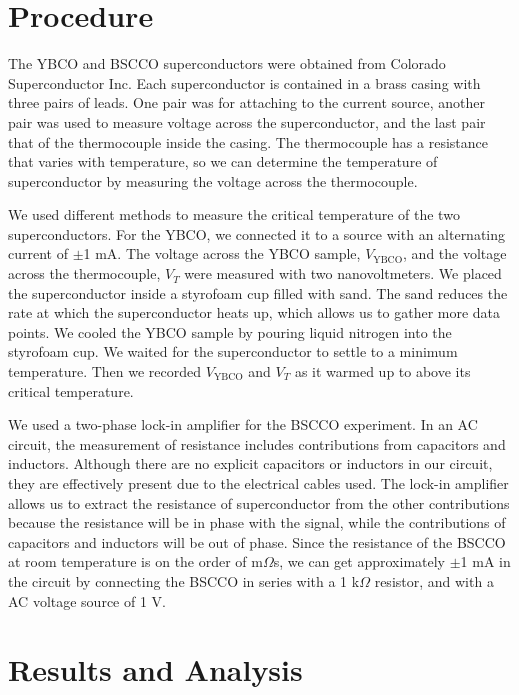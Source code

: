 \documentclass[prb,preprint]{revtex4-1}
\begin{document}
\section{Procedure}
The YBCO and BSCCO superconductors were obtained from Colorado Superconductor Inc. Each superconductor  is contained in a brass casing with three pairs of leads. 
One pair was for attaching to the current source, another pair was used to measure voltage across the superconductor, and the last pair that of the thermocouple inside the casing. 
The thermocouple has a resistance that varies with temperature, so we can determine the  temperature of superconductor by measuring the voltage across the thermocouple. 

We used different methods to measure the critical temperature of the two superconductors.
For the YBCO, we connected it to a source with an alternating current of $\pm$1 mA. 
The voltage across the YBCO sample, $V_{\textrm{YBCO}}$, and the voltage across the thermocouple, $V_{T}$ were measured with two nanovoltmeters. We placed the superconductor inside a styrofoam cup filled with sand. 
The sand reduces the rate at which the superconductor heats up, which allows us to gather more data points. 
We cooled the YBCO sample by pouring liquid nitrogen into the styrofoam cup. We waited for the superconductor to settle to a minimum temperature. Then we recorded $V_{\textrm{YBCO}}$ and $V_{T}$ as it warmed up to above its critical temperature. 

We used a two-phase lock-in amplifier for the BSCCO experiment. In an AC circuit, the measurement of resistance includes contributions from capacitors and inductors. 
Although there are no explicit capacitors or inductors in our circuit, they are effectively present due to the electrical cables used. 
The lock-in amplifier allows us to extract the resistance of superconductor from the other contributions because the resistance will be in phase with the signal, while the contributions of capacitors and inductors will be out of phase. 
Since the resistance of the BSCCO at room temperature is on the order of m$\Omega$s, we can get approximately $\pm$1 mA in the circuit by connecting the BSCCO in series with a 1 k$\Omega$ resistor, and with a AC voltage source of 1 V. 



\section{Results and Analysis}
\end{document}
